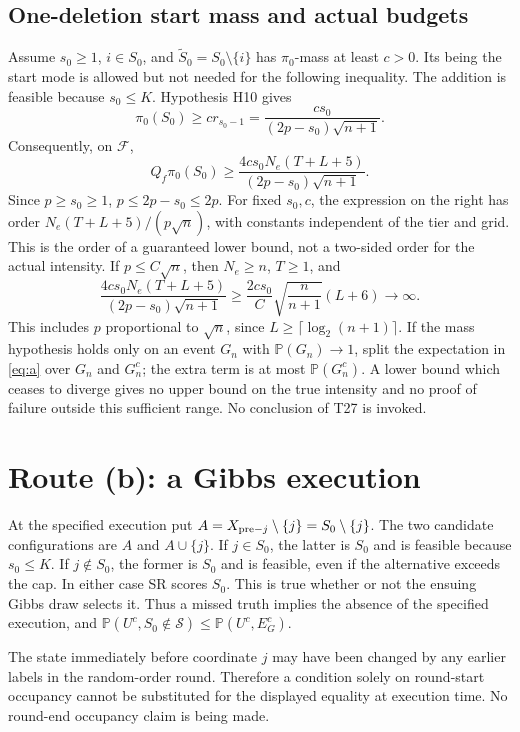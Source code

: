 ﻿\documentclass[11pt]{article}
\newcommand{\Pp}{\mathbb P}
\newcommand{\1}{\mathbf 1}
\newcommand{\Sc}{\mathcal S}
\newcommand{\Fc}{\mathcal F}
\begin{document}
\subsection*{One-deletion start mass and actual budgets}
Assume \(s_0\ge1\), \(i\in S_0\), and
\(\widetilde S_0=S_0\setminus\{i\}\) has \(\pi_0\)-mass at least
\(c>0\). Its being the start mode is allowed but not needed for the following
inequality. The addition is feasible because \(s_0\le K\). Hypothesis H10
gives
\[
 \pi_0(S_0)\ge c r_{s_0-1}
 =\frac{c s_0}{(2p-s_0)\sqrt{n+1}}.
\]
Consequently, on \(\Fc\),
\begin{equation}\label{eq:intensity}
 Q_f\pi_0(S_0)\ge
 \frac{4c s_0N_e(T+L+5)}{(2p-s_0)\sqrt{n+1}}.
\end{equation}
Since \(p\ge s_0\ge1\), \(p\le2p-s_0\le2p\). For fixed
\(s_0,c\), the expression on the right has order
\(N_e(T+L+5)/(p\sqrt n)\), with constants independent of the tier and
grid. This is the order of a guaranteed lower bound, not a two-sided order
for the actual intensity. If \(p\le C\sqrt n\), then \(N_e\ge n\),
\(T\ge1\), and
\[
 \frac{4c s_0N_e(T+L+5)}{(2p-s_0)\sqrt{n+1}}
 \ge\frac{2c s_0}{C}\sqrt{\frac n{n+1}}(L+6)\longrightarrow\infty.
\]
This includes \(p\) proportional to \(\sqrt n\), since
\(L\ge\lceil\log_2(n+1)\rceil\). If the mass hypothesis holds only on
an event \(G_n\) with \(\Pp(G_n)\to1\), split the expectation in
\eqref{eq:a} over \(G_n\) and \(G_n^c\); the extra term is at most
\(\Pp(G_n^c)\). A lower bound which ceases to diverge gives no upper
bound on the true intensity and no proof of failure outside this sufficient
range. No conclusion of T27 is invoked.

\section{Route (b): a Gibbs execution}
At the specified execution put \(A=X_{{\rm pre}-j}\setminus\{j\}
=S_0\setminus\{j\}\). The two candidate configurations are \(A\) and
\(A\cup\{j\}\). If \(j\in S_0\), the latter is \(S_0\) and is
feasible because \(s_0\le K\). If \(j\notin S_0\), the former is
\(S_0\) and is feasible, even if the alternative exceeds the cap. In either
case SR scores \(S_0\). This is true whether or not the ensuing Gibbs draw
selects it. Thus a missed truth implies the absence of the specified
execution, and
\(\Pp(U^c,S_0\notin\Sc)\le\Pp(U^c,E_G^c)\).

The state immediately before coordinate \(j\) may have been changed by any
earlier labels in the random-order round. Therefore a condition solely on
round-start occupancy cannot be substituted for the displayed equality at
execution time. No round-end occupancy claim is being made.
\end{document}

